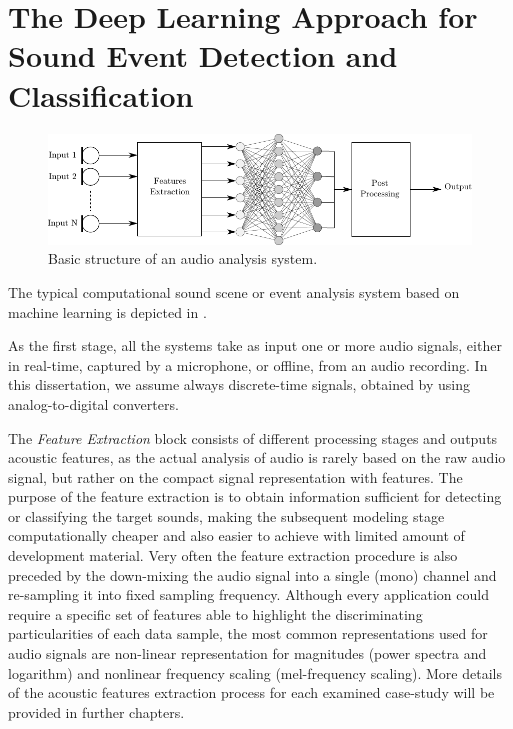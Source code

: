 \section[The Deep Learning Approach]{The Deep Learning Approach for Sound Event Detection and Classification}

\begin{figure}[h]
	\centering
	\includegraphics[width=\linewidth]{img/flowchart_1.pdf}
	\caption[Basic structure]{Basic structure of an audio analysis system.}
	\label{fig:base-system}
\end{figure}


The typical computational sound scene or event analysis system based on machine learning is depicted in .

As the first stage, all the systems take as input one or more audio
signals, either in real-time, captured by a microphone, or offline, from an
audio recording. In this dissertation, we assume always discrete-time signals,
obtained by using analog-to-digital converters. 

The \textit{Feature Extraction} block consists
of different processing stages and outputs acoustic features, as the actual analysis of audio is rarely based on the raw audio signal, but rather on the compact signal
representation with features. The purpose of the feature extraction is to obtain
information sufficient for detecting or classifying the target sounds, making the
subsequent modeling stage computationally cheaper and also easier to achieve with
limited amount of development material. Very often the feature extraction procedure is also preceded by the down-mixing the audio signal into a single (mono) channel and re-sampling it into fixed sampling frequency.
Although every application could require a specific set of features able to highlight the discriminating particularities of each data sample, the most common representations used
for audio signals are non-linear representation for magnitudes (power spectra and logarithm) and nonlinear frequency scaling (mel-frequency scaling). 
More details of the acoustic features extraction process for each examined case-study will be provided in further chapters.


